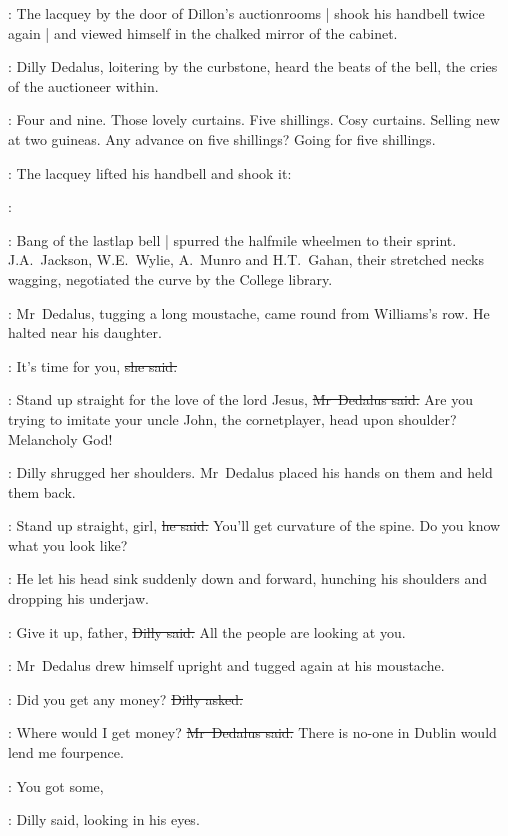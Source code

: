 :
The lacquey by the door of Dillon's auctionrooms |
shook his handbell
twice again |
and viewed himself in the chalked mirror of the cabinet.

:
Dilly Dedalus,
loitering by the curbstone,
heard the beats of the bell,
the cries of the auctioneer within.

\auctioneer:
Four and nine.
Those lovely curtains.
Five shillings.
Cosy curtains.
Selling new at two guineas.
Any advance on five shillings?
Going for five shillings.

:
The lacquey lifted his handbell and shook it:

\bell:
%

\begin{interject}
    :
    Bang of the lastlap bell |
    spurred the halfmile wheelmen to their sprint.
    J.A.~Jackson,
    W.E.~Wylie,
    A.~Munro
    and H.T.~Gahan,
    their stretched necks wagging,
    negotiated the curve by the College library.
\end{interject}

:
Mr~Dedalus,
tugging a long moustache,
came round from Williams's row.
He halted near his daughter.

\dilly:
It's time for you,
\sout{she said.}

\simon:
Stand up straight for the love of the lord Jesus,
\sout{Mr~Dedalus said.}
Are you trying to imitate your uncle John,
the cornetplayer,
head upon shoulder?
Melancholy God!

:
Dilly shrugged her shoulders.
Mr~Dedalus placed his hands on them
and held them back.

\simon:
Stand up straight, girl,
\sout{he said.}
You'll get curvature of the spine.
Do you know what you look like?

:
He let his head sink suddenly down and forward,
hunching his shoulders and dropping his underjaw.

\dilly:
Give it up, father,
\sout{Dilly said.}
All the people are looking at you.

:
Mr~Dedalus drew himself upright
and tugged again at his moustache.

\dilly:
Did you get any money?
\sout{Dilly asked.}

\simon:
Where would I get money?
\sout{Mr~Dedalus said.}
There is no-one in Dublin would lend me fourpence.%

\dilly:
You got some,

:
Dilly said,
looking in his eyes.

